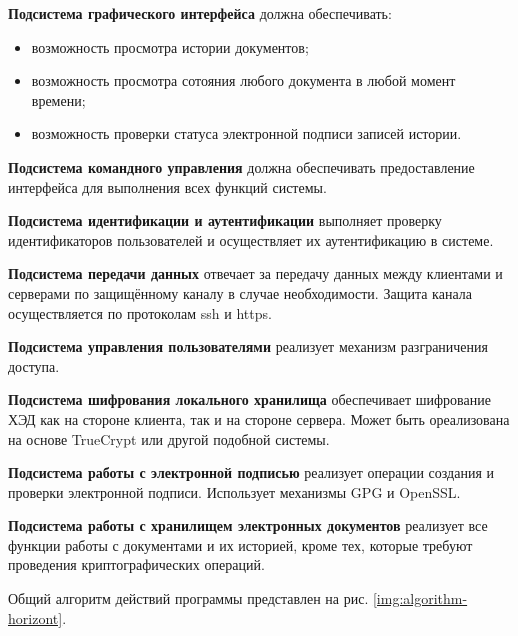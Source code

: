 \vspace{\baselineskip}
\textbf{Подсистема графического интерфейса} должна обеспечивать:
\begin{itemize}
	\item возможность просмотра истории документов;
	\item возможность просмотра сотояния любого документа в любой момент времени;
	\item возможность проверки статуса электронной подписи записей истории.
\end{itemize}

\vspace{\baselineskip}
\textbf{Подсистема командного управления} должна обеспечивать предоставление интерфейса для выполнения всех функций системы.

\vspace{\baselineskip}
\textbf{Подсистема идентификации и аутентификации} выполняет проверку идентификаторов пользователей и осуществляет их аутентификацию в системе.

\vspace{\baselineskip}
\textbf{Подсистема передачи данных} отвечает за передачу данных между клиентами и серверами по защищённому каналу в случае необходимости. Защита канала осуществляется по протоколам ssh и https.

\vspace{\baselineskip}
\textbf{Подсистема управления пользователями} реализует механизм разграничения доступа.

\vspace{\baselineskip}
\textbf{Подсистема шифрования локального хранилища} обеспечивает шифрование ХЭД как на стороне клиента, так и на стороне сервера. Может быть ореализована на основе TrueCrypt или другой подобной системы.

\vspace{\baselineskip}
\textbf{Подсистема работы с электронной подписью} реализует операции создания и проверки электронной подписи. Использует механизмы GPG и OpenSSL.

\vspace{\baselineskip}
\textbf{Подсистема работы с хранилищем электронных документов} реализует все функции работы с документами и их историей, кроме тех, которые требуют проведения криптографических операций.

\vspace{\baselineskip}
Общий алгоритм действий программы представлен на рис. \ref{img:algorithm-horizont}.

